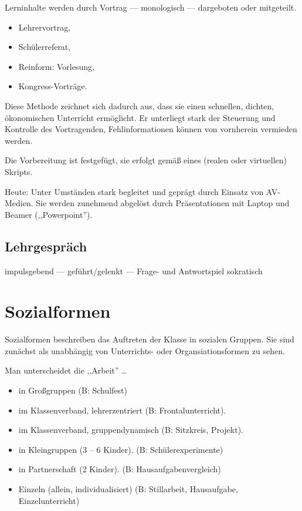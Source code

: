 Lerninhalte werden durch Vortrag --- monologisch ---
dargeboten oder mitgeteilt.

\begin{beisp2}
	\begin{itemize}
\item Lehrervortrag,
\item Sch\"{u}lerreferat,
\item Reinform: Vorlesung,
\item Kongress-Vortr\"{a}ge.
\end{itemize}
\end{beisp2}


Diese Methode zeichnet sich dadurch aus, dass sie
einen schnellen, dichten, \"{o}konomischen Unterricht erm\"{o}glicht.
Er unterliegt stark der Steuerung und Kontrolle des Vortragenden,
Fehlinformationen k\"{o}nnen von vornherein vermieden werden.

\bip
Die Vorbereitung ist festgef\"{u}gt, sie erfolgt gem\"{a}{\ss} eines
(realen oder virtuellen) Skripts.

\bip
Heute: Unter Umst\"{a}nden stark begleitet und gepr\"{a}gt durch
Einsatz von AV-Medien. Sie werden zunehmend abgel\"{o}st durch
Pr\"{a}sentationen mit Laptop und Beamer (,,Powerpoint'').


\subsection{Lehrgespr\"{a}ch}
impulsgebend --- gef\"{u}hrt/gelenkt --- Frage- und Antwortspiel sokratisch


\bip\bip
\section{Sozialformen}\label{Sozial}

Sozialformen beschreiben das Auftreten der Klasse in sozialen
Gruppen.
Sie sind zun\"{a}chst als unabh\"{a}ngig von Unterrichts- oder
Organsiations\-formen zu sehen.

Man unterscheidet die ,,Arbeit'' \dots
\begin{itemize}
\item in Gro{\ss}gruppen (B: Schulfest)
\item im Klassen\-verband, lehrerzentriert (B: Frontalunterricht).
\item im Klassen\-verband, gruppendynamisch (B: Sitzkreis, Projekt).
\item in Kleingruppen (3 -- 6 Kinder). (B: Sch\"{u}lerexperimente)
\item in Partnerschaft (2 Kinder). (B: Hausaufgabenvergleich)
\item Einzeln (allein, individualisiert)
(B: Stillarbeit, Hausaufgabe, Einzelunterricht)
\end{itemize}

